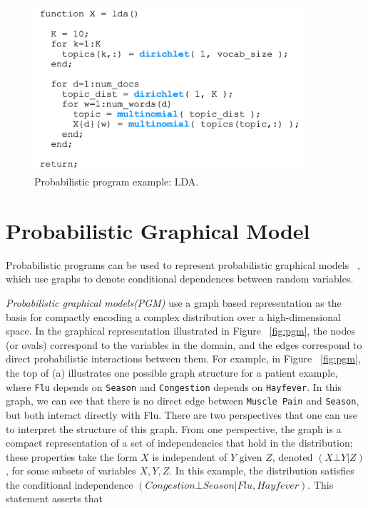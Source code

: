 \begin{figure}
    \centering
    \includegraphics[width=0.9\textwidth]{figures/lda_eg.png}
    \caption{Probabilistic program example: LDA.}
    \label{fig:lda}
\end{figure}


\section{Probabilistic Graphical Model}
\label{sec:pgm}
Probabilistic programs can be used to represent probabilistic graphical models ~\cite{pgm}, which use graphs to denote conditional dependences between random variables.

\textit{Probabilistic graphical models(PGM)} use a graph based representation as the basis for compactly encoding a complex distribution over a high-dimensional space. In the graphical representation illustrated in Figure ~\ref{fig:pgm}, the nodes (or ovals) correspond to the variables in the domain, and the edges correspond to direct probabilistic interactions between them. For example, in Figure ~\ref{fig:pgm}, the top of (a) illustrates one possible graph structure for a patient example, where \texttt{Flu} depends on \texttt{Season} and \texttt{Congestion} depends on \texttt{Hayfever}. In this graph, we can see that there is no direct edge between \texttt{Muscle Pain} and \texttt{Season}, but both interact directly with Flu. There are two perspectives that one can use to interpret the structure of this graph. From one perspective, the graph is a compact representation of a set of independencies that hold in the distribution; these properties take the form $X$ is independent of $Y$ given $Z$, denoted $(X \bot Y | Z)$, for some subsets of variables $X, Y ,Z$. In this example, the distribution satisfies the conditional independence $(Congestion \bot Season | Flu, Hayfever)$. This statement asserts that

